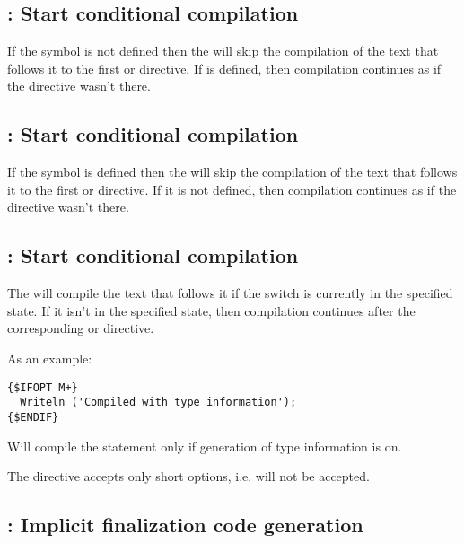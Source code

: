 \subsection{ : Start conditional compilation}

If the symbol  is not defined then the 
will skip the compilation of the text that follows it to the first
 or  directive.
If  is defined, then compilation continues as if the directive
wasn't there.

\subsection{ : Start conditional compilation}

If the symbol  is defined then the 
will skip the compilation of the text that follows it to the first
 or  directive.
If it is not defined, then compilation continues as if the directive
wasn't there.

\subsection{ : Start conditional compilation}

The  will compile the text that follows it if the
switch  is currently in the specified state.
If it isn't in the specified state, then compilation continues after the
corresponding  or  directive.

As an example:
\begin{verbatim}
{$IFOPT M+}
  Writeln ('Compiled with type information');
{$ENDIF}
\end{verbatim}
Will compile the  statement only if generation of type information is on.

\begin{remark}The  directive accepts only short options,
i.e.  will not be accepted.
\end{remark}

\subsection{ : Implicit finalization code
generation}

